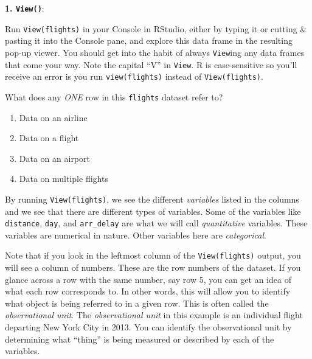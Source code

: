 \documentclass[
  letterpaper,
  DIV=11,
  numbers=noendperiod]{scrreprt}
\providecommand{\tightlist}{%
  \setlength{\itemsep}{0pt}\setlength{\parskip}{0pt}}\usepackage{longtable,booktabs,array}
\theoremstyle{definition}
\theoremstyle{remark}
\begin{document}
\textbf{1. \texttt{View()}}:

Run \texttt{View(flights)} in your Console in RStudio, either by typing
it or cutting \& pasting it into the Console pane, and explore this data
frame in the resulting pop-up viewer. You should get into the habit of
always \texttt{View}ing any data frames that come your way. Note the
capital ``V'' in \texttt{View}. R is case-sensitive so you'll receive an
error is you run \texttt{view(flights)} instead of
\texttt{View(flights)}.

\begin{tcolorbox}[enhanced jigsaw, coltitle=black, toprule=.15mm, bottomtitle=1mm, breakable, leftrule=.75mm, title={{🎯} Learning Check 1.3}, opacitybacktitle=0.6, colback=white, rightrule=.15mm, opacityback=0, toptitle=1mm, colbacktitle=quarto-callout-tip-color!10!white, colframe=quarto-callout-tip-color-frame, titlerule=0mm, arc=.35mm, bottomrule=.15mm, left=2mm]

What does any \emph{ONE} row in this \texttt{flights} dataset refer to?

\begin{enumerate}
\def\labelenumi{\alph{enumi}.}
\tightlist
\item
  Data on an airline
\item
  Data on a flight
\item
  Data on an airport
\item
  Data on multiple flights
\end{enumerate}

\end{tcolorbox}

By running \texttt{View(flights)}, we see the different \emph{variables}
listed in the columns and we see that there are different types of
variables. Some of the variables like \texttt{distance}, \texttt{day},
and \texttt{arr\_delay} are what we will call \emph{quantitative}
variables. These variables are numerical in nature. Other variables here
are \emph{categorical}.

Note that if you look in the leftmost column of the
\texttt{View(flights)} output, you will see a column of numbers. These
are the row numbers of the dataset. If you glance across a row with the
same number, say row 5, you can get an idea of what each row corresponds
to. In other words, this will allow you to identify what object is being
referred to in a given row. This is often called the \emph{observational
unit}. The \emph{observational unit} in this example is an individual
flight departing New York City in 2013. You can identify the
observational unit by determining what ``thing'' is being measured or
described by each of the variables.
\end{document}
